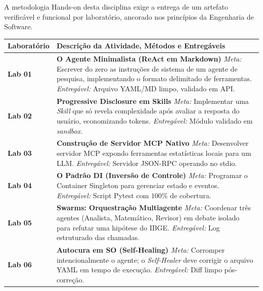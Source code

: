 \documentclass[12pt,a4paper]{article}
\begin{document}
A metodologia Hands-on desta disciplina exige a entrega de um artefato verificável e funcional por laboratório, ancorado nos princípios da Engenharia de Software.

\begin{longtable}{p{} p{}}
\toprule
\textbf{Laboratório} & \textbf{Descrição da Atividade, Métodos e Entregáveis} \\
\midrule
\endfirsthead
\textbf{Lab 01} & \textbf{O Agente Minimalista (ReAct em Markdown)} \newline \textit{Meta:} Escrever do zero as instruções de sistema de um agente de pesquisa, implementando o formato delimitado de ferramentas. \newline \textit{Entregável:} Arquivo YAML/MD limpo, validado em API. \\
\midrule
\textbf{Lab 02} & \textbf{Progressive Disclosure em Skills} \newline \textit{Meta:} Implementar uma \textit{Skill} que só revela complexidade após avaliar a resposta do usuário, economizando tokens. \newline \textit{Entregável:} Módulo validado em \textit{sandbox}. \\
\midrule
\textbf{Lab 03} & \textbf{Construção de Servidor MCP Nativo} \newline \textit{Meta:} Desenvolver servidor MCP expondo ferramentas estatísticas locais para um LLM. \newline \textit{Entregável:} Servidor JSON-RPC operando no stdio. \\
\midrule
\textbf{Lab 04} & \textbf{O Padrão DI (Inversão de Controle)} \newline \textit{Meta:} Programar o Container Singleton para gerenciar estado e eventos. \newline \textit{Entregável:} Script Pytest com $100\%$ de cobertura. \\
\midrule
\textbf{Lab 05} & \textbf{Swarms: Orquestração Multiagente} \newline \textit{Meta:} Coordenar três agentes (Analista, Matemático, Revisor) em debate isolado para refutar uma hipótese do IBGE. \newline \textit{Entregável:} Log estruturado das chamadas. \\
\midrule
\textbf{Lab 06} & \textbf{Autocura em SO (Self-Healing)} \newline \textit{Meta:} Corromper intencionalmente o agente; o \textit{Self-Healer} deve corrigir o arquivo YAML em tempo de execução. \newline \textit{Entregável:} Diff limpo pós-correção. \\

\end{longtable}
\end{document}
